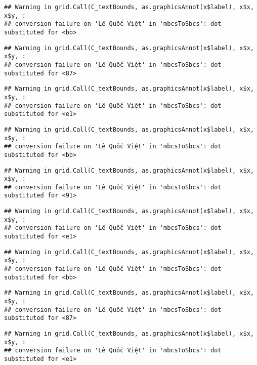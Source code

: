 \documentclass[
]{article}
\begin{document}
\begin{verbatim}
## Warning in grid.Call(C_textBounds, as.graphicsAnnot(x$label), x$x, x$y, :
## conversion failure on 'Lê Quốc Việt' in 'mbcsToSbcs': dot substituted for <bb>
\end{verbatim}

\begin{verbatim}
## Warning in grid.Call(C_textBounds, as.graphicsAnnot(x$label), x$x, x$y, :
## conversion failure on 'Lê Quốc Việt' in 'mbcsToSbcs': dot substituted for <87>
\end{verbatim}

\begin{verbatim}
## Warning in grid.Call(C_textBounds, as.graphicsAnnot(x$label), x$x, x$y, :
## conversion failure on 'Lê Quốc Việt' in 'mbcsToSbcs': dot substituted for <e1>
\end{verbatim}

\begin{verbatim}
## Warning in grid.Call(C_textBounds, as.graphicsAnnot(x$label), x$x, x$y, :
## conversion failure on 'Lê Quốc Việt' in 'mbcsToSbcs': dot substituted for <bb>
\end{verbatim}

\begin{verbatim}
## Warning in grid.Call(C_textBounds, as.graphicsAnnot(x$label), x$x, x$y, :
## conversion failure on 'Lê Quốc Việt' in 'mbcsToSbcs': dot substituted for <91>
\end{verbatim}

\begin{verbatim}
## Warning in grid.Call(C_textBounds, as.graphicsAnnot(x$label), x$x, x$y, :
## conversion failure on 'Lê Quốc Việt' in 'mbcsToSbcs': dot substituted for <e1>
\end{verbatim}

\begin{verbatim}
## Warning in grid.Call(C_textBounds, as.graphicsAnnot(x$label), x$x, x$y, :
## conversion failure on 'Lê Quốc Việt' in 'mbcsToSbcs': dot substituted for <bb>
\end{verbatim}

\begin{verbatim}
## Warning in grid.Call(C_textBounds, as.graphicsAnnot(x$label), x$x, x$y, :
## conversion failure on 'Lê Quốc Việt' in 'mbcsToSbcs': dot substituted for <87>
\end{verbatim}

\begin{verbatim}
## Warning in grid.Call(C_textBounds, as.graphicsAnnot(x$label), x$x, x$y, :
## conversion failure on 'Lê Quốc Việt' in 'mbcsToSbcs': dot substituted for <e1>
\end{verbatim}
\end{document}
